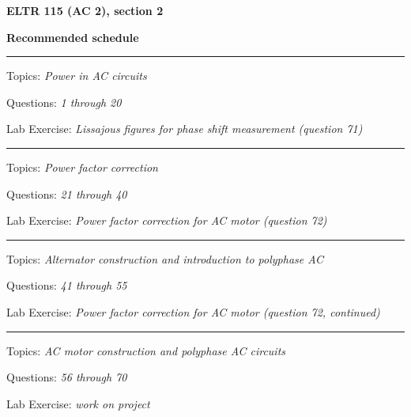 
\centerline{\bf ELTR 115 (AC 2), section 2} \bigskip 
 
\vskip 10pt

\noindent
{\bf Recommended schedule}

\vskip 5pt

\hrule \vskip 5pt
\noindent
{}

\hskip 10pt Topics: {\it Power in AC circuits}
 
\hskip 10pt Questions: {\it 1 through 20}
 
\hskip 10pt Lab Exercise: {\it Lissajous figures for phase shift measurement (question 71)}
 
\vskip 10pt
\hrule \vskip 5pt
\noindent
{}

\hskip 10pt Topics: {\it Power factor correction}
 
\hskip 10pt Questions: {\it 21 through 40}
 
\hskip 10pt Lab Exercise: {\it Power factor correction for AC motor (question 72)}
 

\vskip 10pt
\hrule \vskip 5pt
\noindent
{}

\hskip 10pt Topics: {\it Alternator construction and introduction to polyphase AC}
 
\hskip 10pt Questions: {\it 41 through 55}
 
\hskip 10pt Lab Exercise: {\it Power factor correction for AC motor (question 72, continued)}
 


\vskip 10pt
\hrule \vskip 5pt
\noindent
{}

\hskip 10pt Topics: {\it AC motor construction and polyphase AC circuits}
 
\hskip 10pt Questions: {\it 56 through 70}
 
\hskip 10pt Lab Exercise: {\it work on project}
 


